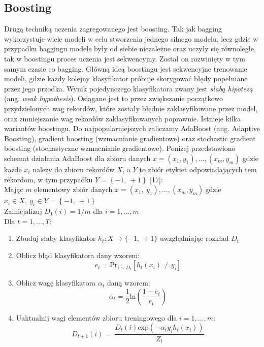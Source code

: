 \documentclass[a4paper,12pt,oneside]{book}
\begin{document}
\subsection{Boosting}
Drugą techniką uczenia zagregowanego jest boosting. Tak jak bagging wykorzystuje wiele modeli w celu stworzenia jednego silnego modelu, lecz gdzie w przypadku baggingu modele były od siebie niezależne oraz uczyły się równolegle, tak w boostingu proces uczenia jest sekwencyjny. Został on rozwinięty w tym samym czasie co bagging. Główną ideą boostingu jest sekwencyjne trenowanie modeli, gdzie każdy kolejny klasyfikator próbuje skorygować błędy popełniane przez jego przodka. Wynik pojedynczego klasyfikatora zwany jest \textit{słabą hipotezą} (ang. \textit{weak hypothesis}). Osiągane jest to przez zwiększanie początkowo przydzielonych wag rekordów, które zostały błędnie zaklasyfikowane przez model, oraz zmniejszanie wag rekordów zaklasyfikowanych poprawnie. Istnieje kilka wariantów boostingu. Do najpopularniejszych zaliczamy AdaBoost (ang. Adaptive Boosting), gradient boosting (wzmacnianie gradientowe) oraz stochastic gradient boosting (stochastyczne wzmacnianie gradientowe). Poniżej przedstawiono schemat działania AdaBoost dla zbioru danych $x=(x_1,y_1 ),…,(x_m,y_m )$ gdzie każde  $x_i$ należy do zbioru rekordów $X$, a $Y$ to zbiór etykiet odpowiadających tem rekordom, w tym przypadku $Y=\left\{-1,\ +1\right\}$ [17]:\\
Mając $m$ elementowy zbiór danych $x=\left(x_1,\ y_1\right),\dots ,\left(x_m,y_m\right)\ $gdzie $x_i\in X,\ y_i\in Y=\left\{-1,\ +1\right\}$\\
Zainicjalizuj $D_1\left(i\right)=1/m$ dla $i=1,\dots ,m$\\
Dla $t=1,\dots ,T$:

\begin{enumerate}
  \item Zbuduj słaby klasyfikator $h_t:X\to \{-1,\ +1\}$ uwzględniając rozkład $D_t$
  \item Oblicz błąd klasyfikatora dany wzorem:
  \begin{equation}
  e_t=\mathrm{P}{\mathrm{r}}_{i\sim D_t}[h_t(x_i)\neq y_i]   
  \end{equation}
  \item Oblicz wagę klasyfikatora ${\alpha }_t$ daną wzorem:
  \begin{equation}
  {\alpha }_t=\frac{1}{2}\mathrm{ln}\mathrm{}(\frac{1-e_t}{e_t})   
  \end{equation}

  \item Uaktualnij wagi elementów zbioru treningowego dla $i=1,\dots ,m$:
  \begin{equation}
   D_{t+1}\left(i\right)=\ \frac{D_t(i)\mathrm{exp}\mathrm{}(-{\alpha }_ty_ih_t\left(x_i\right))}{Z_t}    
  \end{equation}
\end{enumerate}
\end{document}
